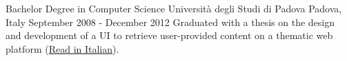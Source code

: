 

\begin{cventries}

  \cventry
    {Bachelor Degree in Computer Science} %
    {Università degli Studi di Padova} %
    {Padova, Italy} %
    {September 2008 - December 2012} %
    {
      Graduated with a thesis on the design and development of a UI to retrieve user-provided content on a thematic web platform (\href{https://s3-eu-west-1.amazonaws.com/eu.nicolamoretto/tesi.pdf}{Read in Italian}).
    }

\end{cventries}
